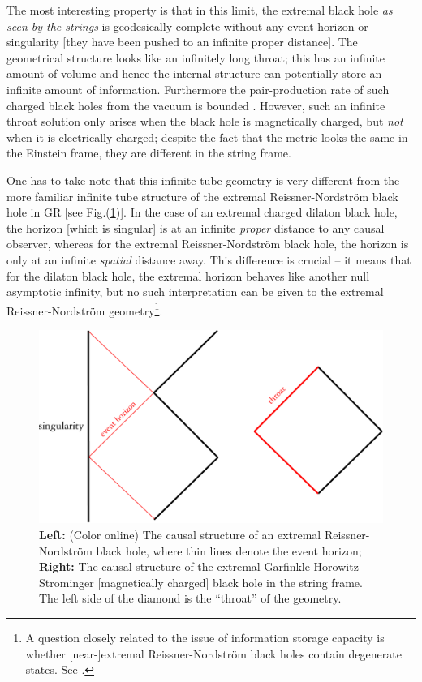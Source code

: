 \documentclass[12pt]{article}
\newcommand{\2}{$^2$}
\newcommand{\3}{$^3$}
\newcommand{\4}{$_4$}
\newcommand{\5}{$_5$}
\begin{document}
The most interesting property is that in this limit, the extremal black hole \emph{as seen by the strings} is geodesically complete without any event horizon or singularity [they have been pushed to an infinite proper distance]. The geometrical structure looks like an infinitely long throat; this has an infinite amount of volume and hence the internal structure can potentially store an infinite amount of information. Furthermore the pair-production rate of such charged black holes from the vacuum is bounded \cite{Banks:1992is}. However, such an infinite throat solution only arises when the black hole is magnetically charged, but \emph{not} when it is electrically charged; despite the fact that the metric looks the same in the Einstein frame, they are different in the string frame.

One has to take note that this infinite tube geometry is very different from the more familiar infinite tube structure of the extremal Reissner-Nordstr\"om black hole in GR [see Fig.(\ref{fig:extreme})]. In the case of an extremal charged dilaton black hole, the horizon [which is singular] is at an infinite \emph{proper} distance to any causal observer, whereas for the extremal Reissner-Nordstr\"om black hole, the horizon is only at an infinite \emph{spatial} distance away. This difference is crucial -- it means that for the dilaton black hole, the extremal horizon behaves like another null asymptotic infinity, but no such interpretation can be given to the extremal Reissner-Nordstr\"om geometry\footnote{A question closely related to the issue of information storage capacity is whether [near-]extremal Reissner-Nordstr\"om black holes contain degenerate states. See \cite{0012020}.}. 

\begin{figure}
\begin{center}
\includegraphics[scale=0.6]{extreme-eps-converted-to.pdf}
\caption{\label{fig:extreme}\textbf{Left:} (Color online) The causal structure of an extremal Reissner-Nordstr\"om black hole, where thin lines denote the event horizon; \textbf{Right:} The causal structure of the extremal Garfinkle-Horowitz-Strominger [magnetically charged] black hole in the string frame. The left side of the diamond is the ``throat'' of the geometry.}
\end{center}
\end{figure}
\end{document}
